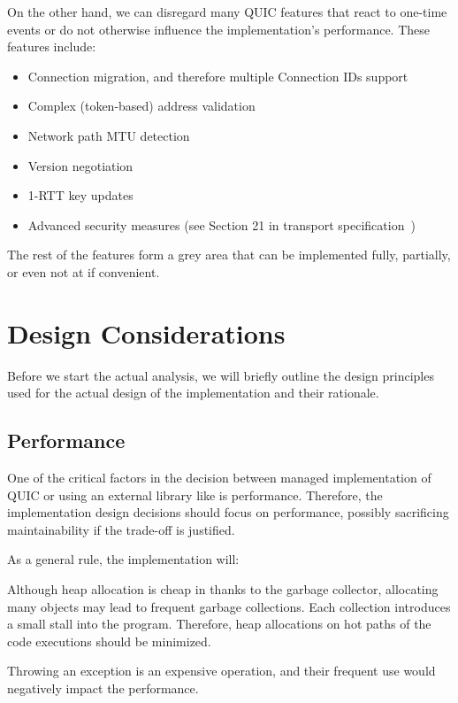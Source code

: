 On the other hand, we can disregard many QUIC features that react to one-time events or do not
otherwise influence the implementation's performance. These features include:

\begin{itemize}

    \item Connection migration, and therefore multiple Connection IDs support

    \item Complex (token-based) address validation

    \item Network path MTU detection

    \item Version negotiation

    \item 1-RTT key updates

    \item Advanced security measures (see Section 21 in transport
specification~\cite{draft-ietf-quic-transport})

\end{itemize}

The rest of the features form a grey area that can be implemented fully, partially, or even not at
if convenient.

\section{Design Considerations}

Before we start the actual analysis, we will briefly outline the design principles used for the
actual design of the implementation and their rationale.

\subsection{Performance}

One of the critical factors in the decision between managed \dotnet{} implementation of QUIC or
using an external library like \libmsquic{} is performance. Therefore, the implementation design
decisions should focus on performance, possibly sacrificing maintainability if the trade-off is
justified.

As a general rule, the implementation will:

\begin{itemize}

     Although heap allocation is cheap in \dotnet{} thanks
to the garbage collector, allocating many objects may lead to frequent garbage collections. Each
collection introduces a small stall into the program. Therefore, heap allocations on hot paths of
the code executions should be minimized.

     Throwing an exception is an expensive operation, and
their frequent use would negatively impact the performance.

\end{itemize}


